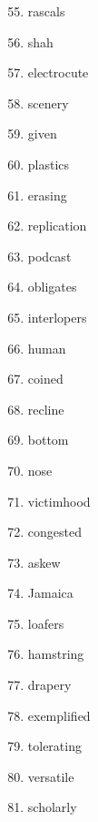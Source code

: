 \documentclass{article}
\begin{document}
  \parbox{0.3\linewidth}{
    \begin{enumerate}
      \setcounter{enumi}{54}
      \item rascals
      \item shah
      \item electrocute
      \item scenery
      \item given
      \item plastics
      \item erasing
      \item replication
      \item podcast
      \item obligates
      \item interlopers
      \item human
      \item coined
      \item recline
      \item bottom
      \item nose
      \item victimhood
      \item congested
      \item askew
      \item Jamaica
      \item loafers
      \item hamstring
      \item drapery
      \item exemplified
      \item tolerating
      \item versatile
      \item scholarly
    \end{enumerate}
  }
\end{document}
